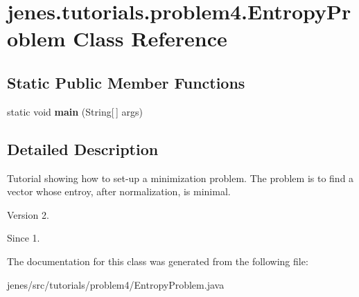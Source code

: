 \hypertarget{classjenes_1_1tutorials_1_1problem4_1_1_entropy_problem}{\section{jenes.\-tutorials.\-problem4.\-Entropy\-Problem Class Reference}
\label{classjenes_1_1tutorials_1_1problem4_1_1_entropy_problem}
}
\subsection*{Static Public Member Functions}
\begin{DoxyCompactItemize}
\item 
\hypertarget{classjenes_1_1tutorials_1_1problem4_1_1_entropy_problem_a9b806aeb673e0324764205d27487524f}{static void {\bfseries main} (String\mbox{[}$\,$\mbox{]} args)}\label{classjenes_1_1tutorials_1_1problem4_1_1_entropy_problem_a9b806aeb673e0324764205d27487524f}

\end{DoxyCompactItemize}


\subsection{Detailed Description}
Tutorial showing how to set-\/up a minimization problem. The problem is to find a vector whose entroy, after normalization, is minimal.

\begin{DoxyVersion}{Version}
2. 
\end{DoxyVersion}
\begin{DoxySince}{Since}
1. 
\end{DoxySince}


The documentation for this class was generated from the following file\-:\begin{DoxyCompactItemize}
\item 
jenes/src/tutorials/problem4/Entropy\-Problem.\-java\end{DoxyCompactItemize}
